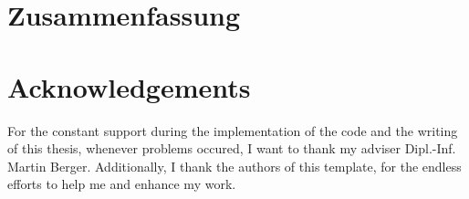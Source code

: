 \chapter*{Zusammenfassung}

\newpage
\chapter*{Acknowledgements}
For the constant support during the implementation of the code and the writing of this thesis, whenever problems occured, I want to thank my adviser Dipl.-Inf. Martin Berger. Additionally, I thank the authors of this template, for the endless efforts to help me and enhance my work.

